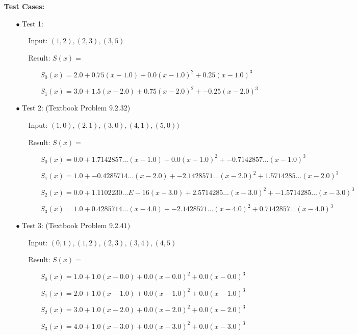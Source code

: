 \documentclass{amsart}
\begin{document}
\begin{enumerate}
	\item[] \textbf{Test Cases:}
	\begin{enumerate}

		\item[\(\bullet\)] Test 1:
		\begin{enumerate}
			\item[] Input: \((1, 2), (2, 3), (3, 5)\)
			\item[] Result: \(S(x) = \)
			\begin{enumerate}
				\item[] \(S_0(x) = 2.0 + 0.75(x - 1.0) + 0.0(x - 1.0)^2 + 0.25(x - 1.0)^3\)
				\item[] \(S_1(x) = 3.0 + 1.5(x - 2.0) + 0.75(x - 2.0)^2 + -0.25(x - 2.0)^3\)
			\end{enumerate}
		\end{enumerate}
			
		\item[\(\bullet\)] Test 2: (Textbook Problem \(9.2.32\))
		\begin{enumerate}
			\item[] Input: \((1, 0), (2, 1), (3, 0), (4, 1), (5, 0))\)
			\item[] Result: \(S(x) = \)
			\begin{enumerate}
				\item[] \(S_0(x) = 0.0 + 1.7142857\ldots(x - 1.0) + 0.0(x - 1.0)^2 + -0.7142857\ldots(x - 1.0)^3\)
				\item[] \(S_1(x) = 1.0 + -0.4285714\ldots(x - 2.0) + -2.1428571\ldots(x - 2.0)^2 + 1.5714285\ldots(x - 2.0)^3\)
				\item[] \(S_2(x) = 0.0 + 1.1102230\ldots E-16(x - 3.0) + 2.5714285\ldots(x - 3.0)^2 + -1.5714285\ldots(x - 3.0)^3\)
				\item[] \(S_3(x) = 1.0 + 0.4285714\ldots(x - 4.0) + -2.1428571\ldots(x - 4.0)^2 + 0.7142857\ldots(x - 4.0)^3\)
			\end{enumerate}
		\end{enumerate}
		
		\item[\(\bullet\)] Test 3: (Textbook Problem \(9.2.41)\)
		\begin{enumerate}
			\item[] Input: \((0, 1), (1, 2), (2, 3), (3, 4), (4, 5)\)
			\item[] Result: \(S(x) = \)
			\begin{enumerate}
				\item[] \(S_0(x) = 1.0 + 1.0(x - 0.0) + 0.0(x - 0.0)^2 + 0.0(x - 0.0)^3\)
				\item[] \(S_1(x) = 2.0 + 1.0(x - 1.0) + 0.0(x - 1.0)^2 + 0.0(x - 1.0)^3\)
				\item[] \(S_2(x) = 3.0 + 1.0(x - 2.0) + 0.0(x - 2.0)^2 + 0.0(x - 2.0)^3\)
				\item[] \(S_3(x) = 4.0 + 1.0(x - 3.0) + 0.0(x - 3.0)^2 + 0.0(x - 3.0)^3\)
			\end{enumerate}
		\end{enumerate}
	\end{enumerate}		
		
\end{enumerate}		
\end{document}
